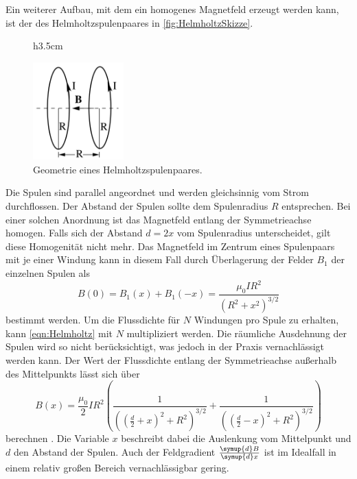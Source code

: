 Ein weiterer Aufbau, mit dem ein homogenes Magnetfeld erzeugt werden kann, ist der des Helmholtzspulenpaares in \autoref{fig:HelmholtzSkizze}.
\begin{figure}{h}{3.5cm}
    \centering
    \caption{Geometrie eines Helmholtzspulenpaares. \cite{v308}}
    \label{fig:HelmholtzSkizze}
    \includegraphics[width=3.5cm]{content/HelmholtzSkizze.jpg}
\end{figure}
Die Spulen sind parallel angeordnet und werden gleichsinnig vom Strom durchflossen. Der Abstand der Spulen sollte dem Spulenradius $R$ entsprechen. Bei einer solchen Anordnung 
ist das Magnetfeld entlang der Symmetrieachse homogen. Falls sich der Abstand $d = 2x$ vom Spulenradius unterscheidet, gilt diese Homogenität nicht mehr. Das Magnetfeld im 
Zentrum eines Spulenpaars mit je einer Windung kann in diesem Fall durch Überlagerung der Felder $B_1$ der einzelnen Spulen als
\begin{equation}
    \label{eqn:Helmholtz}
    B(0) = B_1(x) + B_1(-x) = \frac{\mu_0 I R^2}{(R^2 + x^2)^{3/2}}
\end{equation}
bestimmt werden. Um die Flussdichte für $N$ Windungen pro Spule zu erhalten, kann \autoref{eqn:Helmholtz} mit $N$ multipliziert werden. Die räumliche Ausdehnung
der Spulen wird so nicht berücksichtigt, was jedoch in der Praxis vernachlässigt werden kann. Der Wert der Flussdichte entlang der Symmetrieachse außerhalb des Mittelpunkts lässt sich über
\begin{equation}
    \label{eqn:Helmholtz_theo}
    B(x) = \frac{\mu_0}{2}I R^2 \left(\frac{1}{\left(\left(\frac{d}{2}+x\right)^2 + R^2\right)^{3/2}} + \frac{1}{\left(\left(\frac{d}{2} - x\right)^2 + R^2\right)^{3/2}} \right)
\end{equation}
berechnen \cite{finke92}. Die Variable $x$ beschreibt dabei die Auslenkung vom Mittelpunkt und $d$ den Abstand der Spulen.
Auch der Feldgradient $\frac{\symup{d}B}{\symup{d}x}$ ist im Idealfall in einem relativ großen Bereich vernachlässigbar gering.

